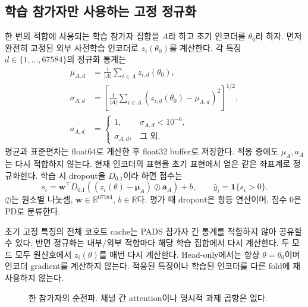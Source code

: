 \documentclass[11pt,a4paper]{article}
\newcommand{\R}{\mathbb{R}}
\newcommand{\ind}{\mathbf{1}}
\begin{document}
\subsection{학습 참가자만 사용하는 고정 정규화}
한 번의 적합에 사용되는 학습 참가자 집합을 $A$라 하고 초기 인코더를 $\theta_0$라 하자.
먼저 완전히 고정된 외부 사전학습 인코더로 $z_i(\theta_0)$를 계산한다.
각 특징 $d\in\{1,\ldots,67584\}$의 정규화 통계는
\begin{align}
 \mu_{A,d}&=\frac1{|A|}\sum_{i\in A}z_{i,d}(\theta_0),\\
 \sigma_{A,d}&=\left[\frac1{|A|}\sum_{i\in A}(z_{i,d}(\theta_0)-\mu_{A,d})^2\right]^{1/2},\\
 a_{A,d}&=\begin{cases}1,&\sigma_{A,d}<10^{-6},\\\sigma_{A,d},&\text{그 외}.
 \end{cases}
\end{align}
평균과 표준편차는 float64로 계산한 후 float32 buffer로 저장한다.
적응 중에도 $\mu_A,a_A$는 다시 적합하지 않는다.
현재 인코더의 표현을 초기 표현에서 얻은 같은 좌표계로 정규화한다.
학습 시 dropout을 $D_{0.1}$이라 하면 점수는
\begin{equation}\label{eq:score}
 s_i=\bm w^\top D_{0.1}\!\left((z_i(\theta)-\bm\mu_A)\oslash\bm a_A\right)+b,
 \qquad \widehat y_i=\ind\{s_i>0\}.
\end{equation}
$\oslash$는 원소별 나눗셈, $\bm w\in\R^{67584}$, $b\in\R$다.
평가 때 dropout은 항등 연산이며, 점수 0은 PD로 분류한다.

초기 고정 특징의 전체 코호트 cache는 PADS 참가자 간 통계를 적합하지 않아 공유할 수 있다.
반면 정규화는 내부/외부 적합마다 해당 학습 집합에서 다시 계산한다.
두 모드 모두 원신호에서 $z_i(\theta)$를 매번 다시 계산한다.
Head-only에서는 항상 $\theta=\theta_0$이며 인코더 gradient를 계산하지 않는다.
적응된 특징이나 학습된 인코더를 다른 fold에 재사용하지 않는다.

\begin{figure}[H]\centering
{}
\caption{한 참가자의 순전파. 채널 간 attention이나 명시적 과제 곱항은 없다.}
\end{figure}
\clearpage
\end{document}
